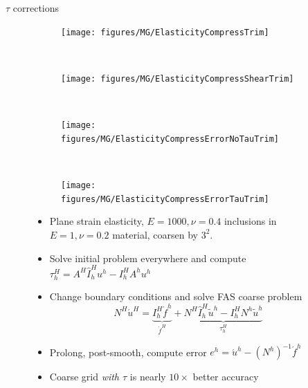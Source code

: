 \documentclass{beamer}
\begin{document}
\begin{frame}{$\tau$ corrections}
  \begin{figure}
  \centering
  \begin{subfigure}[b]{0.18\textwidth}
    \texttt{[image: figures/MG/ElasticityCompressTrim]}
  \end{subfigure} ~
  \begin{subfigure}[b]{0.18\textwidth}
    \texttt{[image: figures/MG/ElasticityCompressShearTrim]}
  \end{subfigure} ~
  \begin{subfigure}[b]{0.28\textwidth}
    \texttt{[image: figures/MG/ElasticityCompressErrorNoTauTrim]}
  \end{subfigure} ~
  \begin{subfigure}[b]{0.28\textwidth}
    \texttt{[image: figures/MG/ElasticityCompressErrorTauTrim]}
  \end{subfigure}
  \begin{itemize}
  \item Plane strain elasticity, $E=1000,\nu=0.4$ inclusions in $E=1,\nu=0.2$ material, coarsen by $3^2$.
  \item Solve initial problem everywhere and compute $\tau_h^H = A^H \hat I_h^H u^h - I_h^H A^h u^h$
  \item Change boundary conditions and solve FAS coarse problem
    \begin{equation*}
      N^H \acute u^H = \underbrace{I_h^H \acute f^h}_{\acute f^H} + \underbrace{N^H \hat I_h^H \tilde u^h - I_h^H N^h \tilde u^h}_{\tau_h^H}
    \end{equation*}
  \item Prolong, post-smooth, compute error $e^h = \acute u^h - (N^h)^{-1} \acute f^h$
  \item<2> \alert{Coarse grid \emph{with $\tau$} is nearly $10\times$ better accuracy}
  \end{itemize}

\end{figure}
\end{frame}
\end{document}

